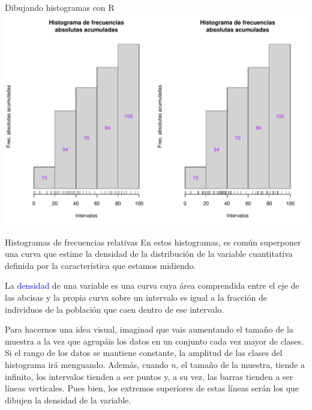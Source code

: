 \documentclass[
  ignorenonframetext,
]{beamer}
\newcommand\blue[1]{\textcolor{blue}{#1}}
\begin{document}
\begin{frame}{Dibujando histogramas con R}
\label{dibujando-histogramas-con-r-9}
\includegraphics{R_base_files/figure-beamer/unnamed-chunk-239-1.pdf}
\end{frame}

\begin{frame}{Histogramas de frecuencias relativas}
\label{histogramas-de-frecuencias-relativas}
En estos histogramas, es común superponer una curva que estime la
densidad de la distribución de la variable cuantitativa definida por la
característica que estamos midiendo.

La \blue{densidad} de una variable es una curva cuya área comprendida
entre el eje de las abcisas y la propia curva sobre un intervalo es
igual a la fracción de individuos de la población que caen dentro de ese
intervalo.

Para hacernos una idea visual, imaginad que vais aumentando el tamaño de
la muestra a la vez que agrupáis los datos en un conjunto cada vez mayor
de clases. Si el rango de los datos se mantiene constante, la amplitud
de las clases del histograma irá menguando. Además, cuando \(n\), el
tamaño de la muestra, tiende a infinito, los intervalos tienden a ser
puntos y, a su vez, las barras tienden a ser líneas verticales. Pues
bien, los extremos superiores de estas líneas serán los que dibujen la
densidad de la variable.
\end{frame}
\end{document}

